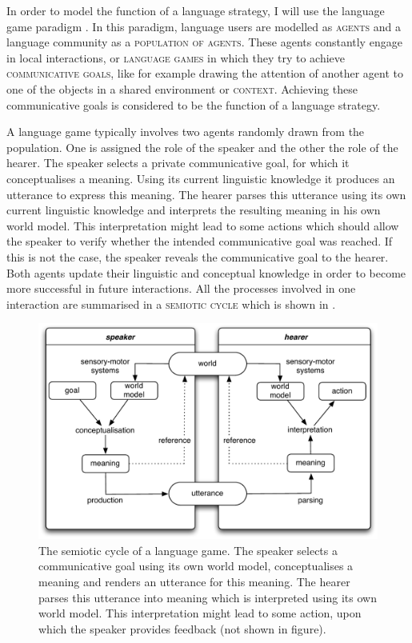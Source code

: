 In order to model the function of a language strategy, I will use the
language game paradigm \citep{steels96self}. In this paradigm,
language users are modelled as \textsc{agents} and a language community
as a \textsc{population of agents}. These agents constantly engage in
local interactions, or \textsc{language games} in
which they try to achieve \textsc{communicative goals}, like for example drawing the
attention of another agent to one of the objects in a shared
environment or \textsc{context}. Achieving these communicative goals is considered to be
the function of a language strategy.

A language game typically involves two agents randomly drawn from the
population. One is assigned the role of the speaker and the other the
role of the hearer. The speaker selects a private communicative goal,
for which it conceptualises a meaning. Using its current linguistic
knowledge it produces an utterance to express this meaning. The hearer
parses this utterance using its own current linguistic knowledge and
interprets the resulting meaning in his own world model. This
interpretation might lead to some actions which should allow the
speaker to verify whether the intended communicative goal was
reached. If this is not the case, the speaker reveals the
communicative goal to the hearer. Both agents update their linguistic
and conceptual knowledge in order to become more successful in future
interactions. All the processes involved in one interaction are
summarised in a \textsc{semiotic cycle} which is
shown in 
\citep{steels03reentrance}.

\begin{figure}
  \begin{center}
   \includegraphics[width=.8\textwidth]{./intro/figures/semiotic-cycle.pdf}
   \caption[The semiotic cycle of a language game]{The semiotic cycle
     of a language game. The speaker selects a communicative goal
     using its own world model, conceptualises a meaning and renders
     an utterance for this meaning. The hearer parses this utterance
     into meaning which is interpreted using its own world model. This
     interpretation might lead to some action, upon which the speaker
     provides feedback (not shown in figure).}
    \label{f:intro-semiotic-cycle}
  \end{center}
\end{figure}

